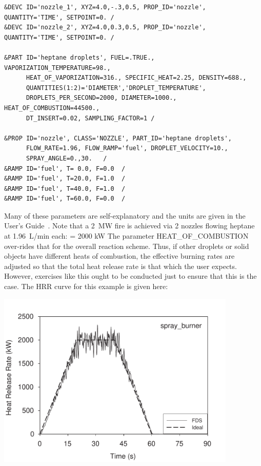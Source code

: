 \documentclass[11pt]{book}
\begin{document}
\footnotesize
\begin{verbatim}
&DEVC ID='nozzle_1', XYZ=4.0,-.3,0.5, PROP_ID='nozzle', QUANTITY='TIME', SETPOINT=0. /
&DEVC ID='nozzle_2', XYZ=4.0,0.3,0.5, PROP_ID='nozzle', QUANTITY='TIME', SETPOINT=0. /

&PART ID='heptane droplets', FUEL=.TRUE., VAPORIZATION_TEMPERATURE=98.,
      HEAT_OF_VAPORIZATION=316., SPECIFIC_HEAT=2.25, DENSITY=688.,
      QUANTITIES(1:2)='DIAMETER','DROPLET_TEMPERATURE',
      DROPLETS_PER_SECOND=2000, DIAMETER=1000., HEAT_OF_COMBUSTION=44500.,
      DT_INSERT=0.02, SAMPLING_FACTOR=1 /

&PROP ID='nozzle', CLASS='NOZZLE', PART_ID='heptane droplets',
      FLOW_RATE=1.96, FLOW_RAMP='fuel', DROPLET_VELOCITY=10.,
      SPRAY_ANGLE=0.,30.   /
&RAMP ID='fuel', T= 0.0, F=0.0  /
&RAMP ID='fuel', T=20.0, F=1.0  /
&RAMP ID='fuel', T=40.0, F=1.0  /
&RAMP ID='fuel', T=60.0, F=0.0  /
\end{verbatim}
\normalsize
Many of these parameters are self-explanatory and the
units are given in the User's Guide~\cite{FDS_Users_Guide_5}. Note
that a 2~MW fire is achieved via 2 nozzles flowing heptane at
1.96~L/min each:
  \;  \times {} \;   \;
 \times {} \;   \;
 = 2000 \; \hbox{kW} \ee
The parameter {\ct HEAT\_OF\_COMBUSTION} over-rides that for the overall reaction scheme. Thus, if other droplets
or solid objects have different heats of combustion, the effective burning rates are adjusted so that the
total heat release rate is that which the user expects. However, exercises like this ought to be conducted just to
ensure that this is the case. The HRR curve for this example is given here:

\begin{center}
\includegraphics[width=4.5in]{FIGURES/spray_burner_HRR}
\end{center}
\end{document}

